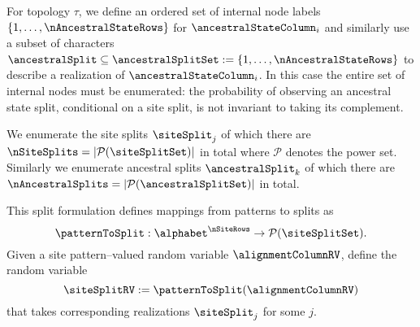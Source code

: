 For topology $\tau$, we define an ordered set of internal node labels $\{1,\ldots,\nAncestralStateRows\}$ for $\ancestralStateColumn_i$ and similarly use a subset of characters $\ancestralSplit\subseteq\ancestralSplitSet:=\{1,\ldots,\nAncestralStateRows\}$ to describe a realization of $\ancestralStateColumn_i$.
In this case the entire set of internal nodes must be enumerated: the probability of observing an ancestral state split, conditional on a site split, is not invariant to taking its complement.

We enumerate the site splits $\siteSplit_j$ of which there are $\nSiteSplits=|\mathcal{P}(\siteSplitSet)|$ in total where $\mathcal{P}$ denotes the power set.
Similarly we enumerate ancestral splits $\ancestralSplit_k$ of which there are $\nAncestralSplits=|\mathcal{P}(\ancestralSplitSet)|$ in total.

This split formulation defines mappings from patterns to splits as
 $$
 \patternToSplit:\alphabet^\nSiteRows\rightarrow\mathcal{P}(\siteSplitSet).
 $$
Given a site pattern--valued random variable $\alignmentColumnRV$, define the random variable
$$
\siteSplitRV := \patternToSplit(\alignmentColumnRV)
$$
that takes corresponding realizations $\siteSplit_j$ for some $j$.

